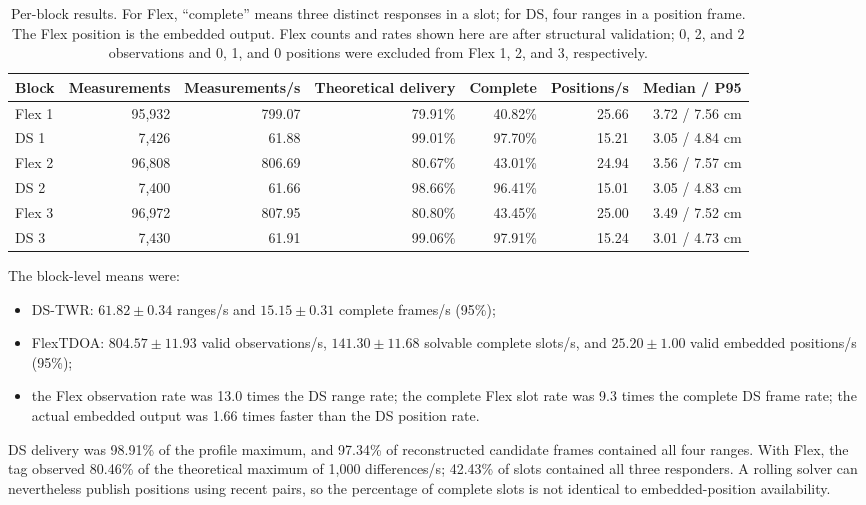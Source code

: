 \documentclass[11pt,a4paper]{article}
\begin{document}
\begin{table}[H]
  \centering
  \caption{Per-block results. For Flex, ``complete'' means three distinct
  responses in a slot; for DS, four ranges in a position frame. The Flex
  position is the embedded output. Flex counts and rates shown here are after
  structural validation; 0, 2, and 2 observations and 0, 1, and 0 positions
  were excluded from Flex 1, 2, and 3, respectively.}
  \scriptsize
  \begin{tabular}{lrrrrrr}
    \toprule
    Block & Measurements & Measurements/s & Theoretical delivery & Complete &
      Positions/s & Median / P95\\
    \midrule
    Flex 1 & 95,932 & 799.07 & 79.91\% & 40.82\% & 25.66 & 3.72 / 7.56 cm\\
    DS 1   & 7,426  & 61.88  & 99.01\% & 97.70\% & 15.21 & 3.05 / 4.84 cm\\
    Flex 2 & 96,808 & 806.69 & 80.67\% & 43.01\% & 24.94 & 3.56 / 7.57 cm\\
    DS 2   & 7,400  & 61.66  & 98.66\% & 96.41\% & 15.01 & 3.05 / 4.83 cm\\
    Flex 3 & 96,972 & 807.95 & 80.80\% & 43.45\% & 25.00 & 3.49 / 7.52 cm\\
    DS 3   & 7,430  & 61.91  & 99.06\% & 97.91\% & 15.24 & 3.01 / 4.73 cm\\
    \bottomrule
  \end{tabular}
\end{table}

The block-level means were:

\begin{itemize}[leftmargin=6mm]
  \item DS-TWR: $61.82\pm0.34$ ranges/s and
  $15.15\pm0.31$ complete frames/s (95\%);
  \item FlexTDOA: $804.57\pm11.93$ valid observations/s,
  $141.30\pm11.68$ solvable complete slots/s, and
  $25.20\pm1.00$ valid embedded positions/s (95\%);
  \item the Flex observation rate was 13.0 times the DS range rate;
  the complete Flex slot rate was 9.3 times the complete DS frame rate;
  the actual embedded output was 1.66 times faster than the DS position rate.
\end{itemize}

DS delivery was 98.91\% of the profile maximum, and 97.34\% of reconstructed
candidate frames contained all four ranges. With Flex, the tag observed
80.46\% of the theoretical maximum of 1,000 differences/s; 42.43\% of slots
contained all three responders. A rolling solver can nevertheless publish
positions using recent pairs, so the percentage of complete slots is not
identical to embedded-position availability.
\end{document}
